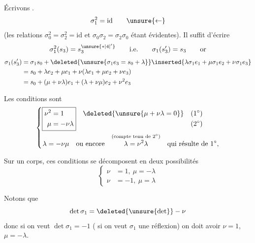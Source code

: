 Écrivons .
\[
\sigma_1^2=\mathrm{id}\qquad\unsure{\leftarrow}
\]
(les relations $\sigma_0^2=\sigma_2^2=\mathrm{id}$ et $\sigma_0\sigma_2=\sigma_2\sigma_0$ étant évidentes). Il suffit d'écrire
\[
\sigma_1^2(s_3)=s_3^{\unsure{*|4|' }}\qquad\text{i.e.}\qquad\sigma_1(s'_3)=s_3\qquad\text{or}
\]
\[
\begin{aligned}
\sigma_1(s'_3)&=\sigma_1s_0+\deleted{\unsure{\sigma_1e_3=s_0+\lambda}}\inserted{\lambda\sigma_1e_1+\mu\sigma_1e_2+\nu\sigma_1e_3}\\
&=s_0+\lambda e_2+\mu e_1+\nu(\lambda e_1+\mu e_2+\nu e_3)\\
&=s_0+(\mu+\nu\lambda)e_1+(\lambda+\nu\mu)e_2+\nu^2e_3
\end{aligned}
\]
\margin{$\lambda\ \mu\ \nu$}

Les conditions sont
\[
\left\{\begin{aligned}
\boxed{\begin{aligned}\nu^2&=1\\\mu&=-\nu\lambda\end{aligned}}
&\quad\begin{aligned}\deleted{\unsure{\mu+\nu\lambda=0}}\quad &(1^\circ)\\ &(2^\circ)\end{aligned}\\
\lambda=-\nu\mu\quad&\text{ou encore}\quad
\overset{\text{(compte tenu de }2^\circ\text{)}}{\lambda=\nu^2\lambda}\quad\text{qui résulte de }1^\circ,
\end{aligned}\right.
\]

Sur un corps, ces conditions se décomposent en deux possibilités
\[
\left\{\begin{aligned}\nu&=1,\ \mu=-\lambda\\\nu&=-1,\ \mu=\lambda\end{aligned}\right.
\]

Notons que
\[
\det\sigma_1=\deleted{\unsure{\det}}-\nu
\]
donc si on veut $\det\sigma_1=-1$ ( si on veut $\sigma_1$ une réflexion) on doit avoir $\nu=1$, $\mu=-\lambda$.

